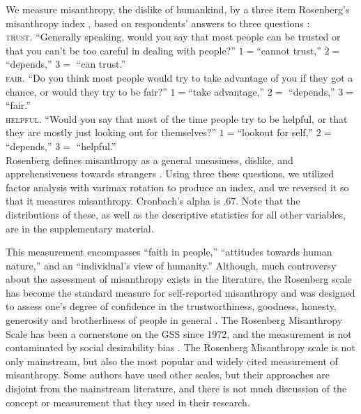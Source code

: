 \documentclass[11pt, letterpaper]{article}
\begin{document}
\begin{spacing}{1.4}
We measure misanthropy, the dislike of humankind, by a three item  Rosenberg's  misanthropy index \citep{rosenberg56}, based on respondents' answers to three questions \citep{smith97}:\\

\indent\textsc{trust}. ``Generally speaking, would you say that most people can be trusted or that you can't be too
careful in dealing with people?''  $1=$``cannot trust,'' $2=$     ``depends,'' $3=$   ``can trust.''\\
\indent\textsc{fair}. ``Do you think most people would try to take advantage of you if they got a chance, or
would they try to be fair?'' $1=$``take advantage,'' $2=$       ``depends,'' $3=$          ``fair.'' \\
\indent\textsc{helpful}. ``Would you say that most of the time people try to be helpful, or that they are mostly just
looking out for themselves?'' $1=$``lookout for self,'' $2=$       ``depends,'' $3=$        ``helpful.''\\ 

Rosenberg defines misanthropy as a general uneasiness, dislike, and apprehensiveness towards strangers \citep{rosenberg56}. Using three these questions, we utilized factor analysis with varimax rotation to produce an index, and we reversed it so that it measures misanthropy. Cronbach's alpha is .67. Note that the distributions of these, as well as the descriptive statistics for all other variables, are in the supplementary material.

This measurement encompasses ``faith in people,'' ``attitudes towards human nature,'' and an ``individual's view of humanity.'' Although, much controversy about the assessment of misanthropy exists in the literature, the Rosenberg scale has become the standard measure for self-reported misanthropy and was designed to assess one's degree of confidence in the trustworthiness, goodness, honesty, generosity and brotherliness of people in general \citep{rosenberg56}. The Rosenberg Misanthropy Scale has been a cornerstone on the GSS since 1972, and  the measurement is not contaminated by social desirability bias \citep{ray81}. 
The Rosenberg Misanthropy scale is not only mainstream, but also the most popular and widely cited measurement of misanthropy. Some authors   \citep[e.g.,][]{wuensch2002misanthropy} have used other scales, but their approaches are disjoint from the mainstream literature, and there is not much discussion of the concept or measurement that they used in their research.  


\end{spacing}
\end{document}
